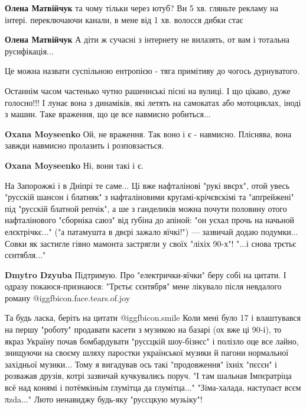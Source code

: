 \begin{itemize}
\begin{itemize} %
\textbf{Олена Матвійчук} та чому тільки через ютуб? Ви 5 хв. гляньте рекламу на інтері. переключаючи канали, в мене від 1 хв. волосся дибки стає

\textbf{Олена Матвійчук} А діти ж сучасні з інтернету не вилазять, от вам і тотальна русифікація...
\end{itemize} %

Це можна назвати суспільною ентропією - тяга примітиву до чогось дурнуватого.


Останнім часом частенько чутно рашеннські пісні на вулиці. І що цікаво, дуже
голосно!!! І лунає вона з динаміків, які летять на самокатах або
мотоциклах, іноді з машин. Таке враження, що це все навмисно робиться...

\begin{itemize} %
\textbf{Oxana Moyseenko}
Ой, не враження. Так воно і є - навмисно. Пліснява, вона завжди навмисно пролазить і розповзається.

\textbf{Oxana Moyseenko} Ні, вони такі і є.
\end{itemize} %

На Запорожжі і в Дніпрі те саме...
Ці вже нафталінові "рукі ввєрх", отой увесь "русскій шансон і блатняк" з нафталіновими круґамі-крічєвскімі та "апґрейжені" під "русскій блатной репчік", а ше з ганделиків можна почути половину отого нафталінового "сборніка саюз" від ґубіна до апіной:
"он уєхал прочь на начьной елєктрічкє..."
("а патамушта в двєрі зажало яїчкі!") — зазвичай додаю подумки...
Совки як застигле гівно мамонта застрягли у своїх "ліхіх 90-х"!
"...і снова трєтьє сєнтябля..."

\begin{itemize} %
\textbf{Dmytro Dzyuba}
Підтримую.
Про "електрички-яїчки" беру собі на цитати.
І одразу покаюся-признаюся: "Трєтьє сєнтября" мене лікувало після невдалого роману  @igg{fbicon.face.tears.of.joy} 

Та будь ласка, беріть на цитати  @igg{fbicon.smile} 
Коли мені було 17 і влаштувався на першу "роботу" продавати касети з музикою на базарі (ох вже ці 90-і), то якраз Україну почав бомбардувати "руссцкій шоу-бізнєс" і полізло оце все лайно, знищуючи на своєму шляху паростки української музики й пагони нормальної західньої музики...
Тому я вигадував ось такі "продовження" їхніх "пєсєн" і розважав друзів, котрі зазвичай кучкувались поруч.
"І там шальная Імпєратріца
всё над конямі і потёмкіньім ґлумітца да ґлумітца..."
"Зіма-халада, наступаєт всєм πzda..."
Люто ненавиджу будь-яку "руссцкую музьіку"!


\end{itemize}
\end{itemize}
